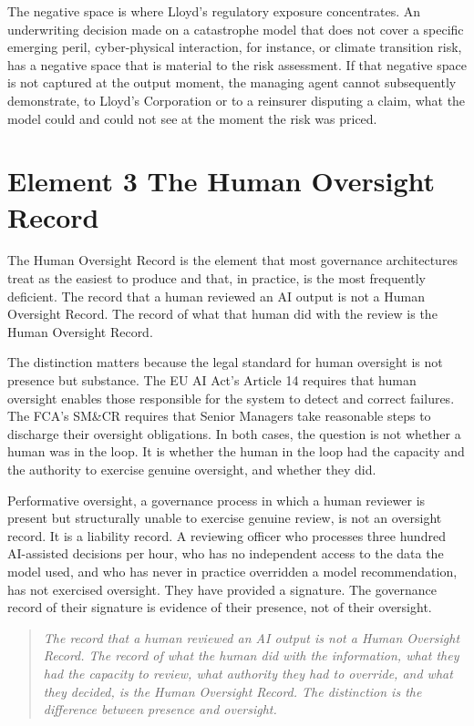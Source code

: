 The negative space is where Lloyd's regulatory exposure concentrates. An underwriting decision made on a catastrophe model that does not cover a specific emerging peril, cyber-physical interaction, for instance, or climate transition risk, has a negative space that is material to the risk assessment. If that negative space is not captured at the output moment, the managing agent cannot subsequently demonstrate, to Lloyd's Corporation or to a reinsurer disputing a claim, what the model could and could not see at the moment the risk was priced.

\scenebreak

\section{Element 3 The Human Oversight Record}

The Human Oversight Record is the element that most governance architectures treat as the easiest to produce and that, in practice, is the most frequently deficient. The record that a human reviewed an AI output is not a Human Oversight Record. The record of what that human did with the review is the Human Oversight Record.

The distinction matters because the legal standard for human oversight is not presence but substance. The EU AI Act's Article 14 requires that human oversight enables those responsible for the system to detect and correct failures. The FCA's SM\&CR requires that Senior Managers take reasonable steps to discharge their oversight obligations. In both cases, the question is not whether a human was in the loop. It is whether the human in the loop had the capacity and the authority to exercise genuine oversight, and whether they did.

Performative oversight, a governance process in which a human reviewer is present but structurally unable to exercise genuine review, is not an oversight record. It is a liability record. A reviewing officer who processes three hundred AI-assisted decisions per hour, who has no independent access to the data the model used, and who has never in practice overridden a model recommendation, has not exercised oversight. They have provided a signature. The governance record of their signature is evidence of their presence, not of their oversight.

\begin{quote}
\emph{The record that a human reviewed an AI output is not a Human Oversight Record. The record of what the human did with the information, what they had the capacity to review, what authority they had to override, and what they decided, is the Human Oversight Record. The distinction is the difference between presence and oversight.}
\end{quote}

